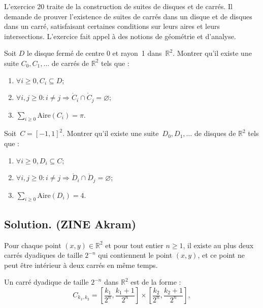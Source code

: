 L'exercice 20 traite de la construction de suites de disques et de carr{\'e}s.
Il demande de prouver l'existence de suites de carr{\'e}s dans un disque et de
disques dans un carr{\'e}, satisfaisant certaines conditions sur leurs aires
et leurs intersections. L'exercice fait appel {\`a} des notions de
g{\'e}om{\'e}trie et d'analyse.
\begin{exercise}
Soit $D$ le disque ferm{\'e} de centre 0 et rayon~1 dans~$\mathbb{R}^2$.
Montrer qu'il existe une suite $C_0, C_1, \ldots$ de carr{\'e}s de
$\mathbb{R}^2$ tels que :
\begin{enumerate}
  \item $\forall i \geq 0, C_i \subseteq D$;
  
  \item $\forall i, j \geq 0 : i \neq j \Rightarrow \ring{C}_i \cap \ring{C}_j
  = \varnothing$;
  
  \item $\sum_{i \geq 0} \mathrm{Aire} (C_i) = \pi$.
\end{enumerate}


Soit~$C = [- 1, 1]^2$. Montrer qu'il existe une suite~$D_0, D_1, \ldots$ de
disques de $\mathbb{R}^2$ tels que :
\begin{enumerate}
  \item $\forall i \geq 0, D_i \subseteq C$;
  
  \item $\forall i, j \geq 0 : i \neq j \Rightarrow \ring{D}_i \cap \ring{D}_j
  = \varnothing$;
  
  \item $\sum_{i \geq 0} \mathrm{Aire} (D_i) = 4$.
\end{enumerate}
\end{exercise}

\subsection*{Solution. (ZINE Akram)}


 Pour chaque point $(x, y) \in \mathbb{R}^2$ et pour tout
entier $n \geq 1$, il existe au plus deux carr{\'e}s dyadiques de taille $2^{-
n}$ qui contiennent le point $(x, y)$, et ce point ne peut {\^e}tre
int{\'e}rieur {\`a} deux carr{\'e}s en m{\^e}me temps.


Un carr{\'e} dyadique de taille $2^{- n}$ dans $\mathbb{R}^2$ est de la forme
:
\[ C_{k_1, k_2} = \left[ \frac{k_1}{2^n}, \frac{k_1 + 1}{2^n} \right] \times
   \left[ \frac{k_2}{2^n}, \frac{k_2 + 1}{2^n} \right], \]


